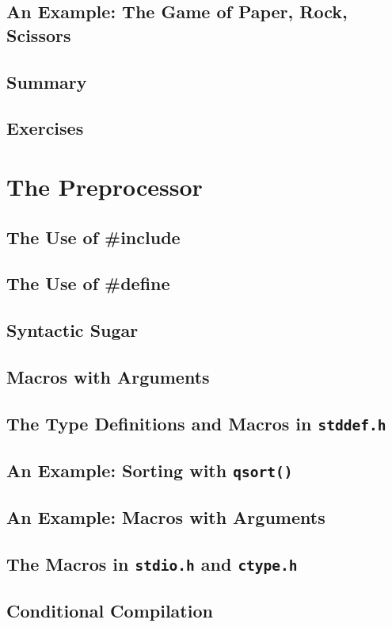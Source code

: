 \documentclass{article}
\begin{document}
\section{An Example: The Game of Paper, Rock, Scissors}
\section{Summary}
\section{Exercises}

\chapter{The Preprocessor}

\section{The Use of \#include}
\section{The Use of \#define}
\section{Syntactic Sugar}
\section{Macros with Arguments}
\section{The Type Definitions and Macros in \texttt{stddef.h}}
\section{An Example: Sorting with \texttt{qsort()}}
\section{An Example: Macros with Arguments}
\section{The Macros in \texttt{stdio.h} and \texttt{ctype.h}}
\section{Conditional Compilation}
\end{document}
